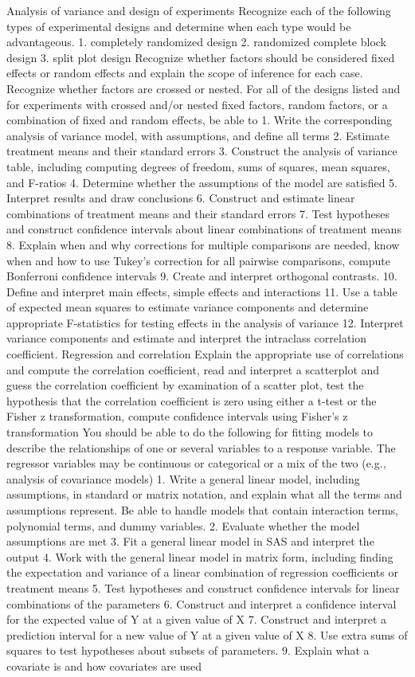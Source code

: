 \documentclass[]{book}
\theoremstyle{definition}
\theoremstyle{definition}
\theoremstyle{definition}
\theoremstyle{remark}
\begin{document}
Analysis of variance and design of experiments Recognize each of the
following types of experimental designs and determine when each type
would be advantageous. 1. completely randomized design 2. randomized
complete block design 3. split plot design Recognize whether factors
should be considered fixed effects or random effects and explain the
scope of inference for each case. Recognize whether factors are crossed
or nested. For all of the designs listed and for experiments with
crossed and/or nested fixed factors, random factors, or a combination of
fixed and random effects, be able to 1. Write the corresponding analysis
of variance model, with assumptions, and define all terms 2. Estimate
treatment means and their standard errors 3. Construct the analysis of
variance table, including computing degrees of freedom, sums of squares,
mean squares, and F-ratios 4. Determine whether the assumptions of the
model are satisfied 5. Interpret results and draw conclusions 6.
Construct and estimate linear combinations of treatment means and their
standard errors 7. Test hypotheses and construct confidence intervals
about linear combinations of treatment means 8. Explain when and why
corrections for multiple comparisons are needed, know when and how to
use Tukey's correction for all pairwise comparisons, compute Bonferroni
confidence intervals 9. Create and interpret orthogonal contrasts. 10.
Define and interpret main effects, simple effects and interactions 11.
Use a table of expected mean squares to estimate variance components and
determine appropriate F-statistics for testing effects in the analysis
of variance 12. Interpret variance components and estimate and interpret
the intraclass correlation coefficient. Regression and correlation
Explain the appropriate use of correlations and compute the correlation
coefficient, read and interpret a scatterplot and guess the correlation
coefficient by examination of a scatter plot, test the hypothesis that
the correlation coefficient is zero using either a t-test or the Fisher
z transformation, compute confidence intervals using Fisher's z
transformation You should be able to do the following for fitting models
to describe the relationships of one or several variables to a response
variable. The regressor variables may be continuous or categorical or a
mix of the two (e.g., analysis of covariance models) 1. Write a general
linear model, including assumptions, in standard or matrix notation, and
explain what all the terms and assumptions represent. Be able to handle
models that contain interaction terms, polynomial terms, and dummy
variables. 2. Evaluate whether the model assumptions are met 3. Fit a
general linear model in SAS and interpret the output 4. Work with the
general linear model in matrix form, including finding the expectation
and variance of a linear combination of regression coefficients or
treatment means 5. Test hypotheses and construct confidence intervals
for linear combinations of the parameters 6. Construct and interpret a
confidence interval for the expected value of Y at a given value of X 7.
Construct and interpret a prediction interval for a new value of Y at a
given value of X 8. Use extra sums of squares to test hypotheses about
subsets of parameters. 9. Explain what a covariate is and how covariates
are used
\end{document}
